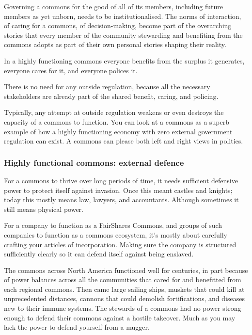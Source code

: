 Governing a commons for the good of all of its members, including future members as yet unborn, needs to be institutionalised. The norms of interaction, of caring for a commons, of decision-making, become part of the overarching stories that every member of the community stewarding and benefiting from the commons adopts as part of their own personal stories shaping their reality.


In a highly functioning commons everyone benefits from the surplus it generates, everyone cares for it, and everyone polices it.


There is no need for any outside regulation, because all the necessary stakeholders are already part of the shared benefit, caring, and policing. 


Typically, any attempt at outside regulation weakens or even destroys the capacity of a commons to function. You can look at a commons as a superb example of how a highly functioning economy with zero external government regulation can exist. A commons can please both left and right views in politics.




\subsubsection{Highly functional commons: external defence}
For a commons to thrive over long periods of time, it needs sufficient defensive power to protect itself against invasion. Once this meant castles and knights; today this mostly means law, lawyers, and accountants. Although sometimes it still means physical power.


For a company to function as a FairShares Commons, and groups of such companies to function as a commons ecosystem, it's mostly about carefully crafting your articles of incorporation. Making sure the company is structured sufficiently clearly so it can defend itself against being enslaved.


The commons across North America functioned well for centuries, in part because of power balances across all the communities that cared for and benefitted from each regional commons. Then came large sailing ships, muskets that could kill at unprecedented distances, cannons that could demolish fortifications, and diseases new to their immune systems. The stewards of a commons had no power strong enough to defend their commons against a hostile takeover. Much as you may lack the power to defend yourself from a mugger.


